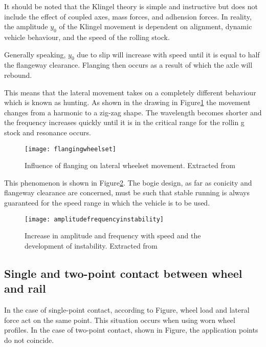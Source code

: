 It should be noted that the Klingel theory is simple and instructive but does not include the effect of coupled axes, mass forces, and adhension forces. In reality, the amplitude $y_0$ of the Klingel movement is dependent on alignment, dynamic vehicle behaviour, and the speed of the rolling stock. 

Generally speaking, $y_0$ due to slip will increase with speed until it is equal to half the flangeway clearance. Flanging then occurs as a result of which the axle will rebound. 

This means that the lateral movement takes on a completely different behaviour which is known as hunting. As shown in the drawing in Figure\ref{fig:flangingwheelset} the movement changes from a harmonic to a zig-zag shape. The wavelength becomes shorter and the frequency increases quickly until it is in the critical range for the rollin g stock and resonance occurs.

\begin{figure}[h!]
    \centering
    \texttt{[image: flangingwheelset]}
    \caption{Influence of flanging on lateral wheelset movement. Extracted from \cite[Figure 2.5]{esveld2001modern}}
    \label{fig:flangingwheelset}
\end{figure}

This phenomenon is shown in Figure\ref{fig:amplitudefrequencystability}. The bogie design, as far as conicity and flangeway clearance are concerned, must be such that stable running is always guaranteed for the speed range in which the vehicle is to be used.


\begin{figure}[h!]
    \centering
    \texttt{[image: amplitudefrequencyinstability]}
    \caption{Increase in amplitude and frequency with speed and the development of instability. Extracted from \cite[Figure 2.6]{esveld2001modern}}
    \label{fig:amplitudefrequencystability}
\end{figure}

\subsection{Single and two-point contact between wheel and rail}
In the case of single-point contact, according to Figure, wheel load and lateral force act on the same point. This situation occurs when using worn wheel profiles. In the case of two-point contact, shown in Figure, the application points do not coincide.

